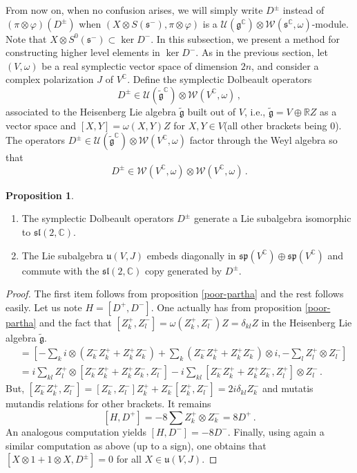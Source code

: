 \documentclass{amsart}[draft,11pt]
\newcommand{\ms}{\mathfrak{s}}
\newcommand{\fg}{{\mathfrak{g}}}
\numberwithin{equation}{section}
\theoremstyle{definition}
\newtheorem{proposition}[theorem]{Proposition}
\begin{document}
From now on, when no confusion arises, we will simply write
$D^\pm$ instead of $(\pi\otimes\varphi)(D^\pm)$ when $(X\otimes S(\ms^-),\pi\otimes\varphi)$ is a $\mathcal{U}(\fg^\mathbb{C})\otimes \mathcal W(\ms^\mathbb{C},\omega)$-module.
Note that $X\otimes S^0(\ms^-) \subset \ker D^-$.
In this subsection, we present a method for constructing higher level elements in $\ker D^-$. As in the previous section, let $(V,\omega)$ be a real symplectic vector space of dimension $2n$, and consider a complex polarization $J$ of $V^{\mathbb C}$. Define the symplectic Dolbeault operators 
$$D^\pm \in \mathcal{U}(\tilde{\fg}^\mathbb{C})\otimes \mathcal{W}(V^\mathbb{C},\omega)\,,$$
associated to the Heisenberg Lie algebra $\tilde{\fg}$ built out of $V$, i.e., $\tilde{\fg}= V \oplus \mathbb{R}Z$ as a vector space
and $[X,Y]=\omega(X,Y)Z$ for $X,Y \in V$(all other
brackets being $0$). The operators 
$D^\pm \in \mathcal{U}(\tilde{\mathfrak g}^\mathbb{C})\otimes \mathcal W(V^\mathbb C,\omega)$ factor through the Weyl algebra so that
$$ D^\pm \in \mathcal{W}(V^\mathbb{C},\omega) \otimes \mathcal{W}(V^\mathbb{C},\omega)\,. 
$$
\begin{proposition}
\begin{enumerate}
    \item The symplectic Dolbeault operators $D^\pm$
    generate a Lie subalgebra isomorphic to $\mathfrak{sl}(2,\mathbb C)$.
    \item The Lie subalgebra $\mathfrak{u}(V,J)$ embeds diagonally
    in $\mathfrak{sp}(V^\mathbb{C})\oplus \mathfrak{sp}(V^\mathbb{C})$ and commute with the $\mathfrak{sl}(2,\mathbb C)$ copy generated by $D^\pm$.
\end{enumerate}
\end{proposition}
\begin{proof}
The first item follows from proposition \ref{poor-partha}
and the rest follows easily. Let us note $H=[D^+,D^-]$.
One actually has from proposition \ref{poor-partha} and the fact that $[Z_k^+,Z_l^-]=\omega(Z_k^+,Z_l^-)Z=\delta_{kl}Z$ 
in the Heisenberg Lie algebra $\tilde{\mathfrak g}$.
\begin{align*}
    [H,D^+]
    &=
    \left[
        -\sum_{k}  i \otimes (Z_k^-Z_k^+ + Z_k^+Z_k^-)
            + \sum_k (Z_k^-Z_k^++Z_k^+Z_k^-)\otimes i, 
        -\sum_l  Z_l^+\otimes Z_l^-
    \right] \\
    &=  i\sum_{kl}Z_l^+ \otimes [Z_k^-Z_k^+ + Z_k^+Z_k^-,Z_l^-] 
        -i\sum_{kl} [Z_k^-Z_k^+ + Z_k^+Z_k^-,Z_l^+] \otimes Z_l^- \,.
\end{align*}
But, $[Z_k^-Z_k^+,Z_l^-]=[Z_k^-,Z_l^-]Z_k^++Z_k^-[Z_k^+,Z_l^-]=2i\delta_{kl}Z_k^-$ and mutatis mutandis relations for other brackets. It remains
$$ [H,D^+]=-8\sum Z_k^+\otimes Z_k^-=8D^+\,.$$
An analogous computation yields $[H,D^-]=-8D^-$. Finally,
 using again a similar computation as above (up to a sign), one obtains that
$[X\otimes 1 + 1\otimes X, D^\pm] = 0 $ for all $X\in \mathfrak{u}(V,J)$.
\end{proof}
\end{document}
